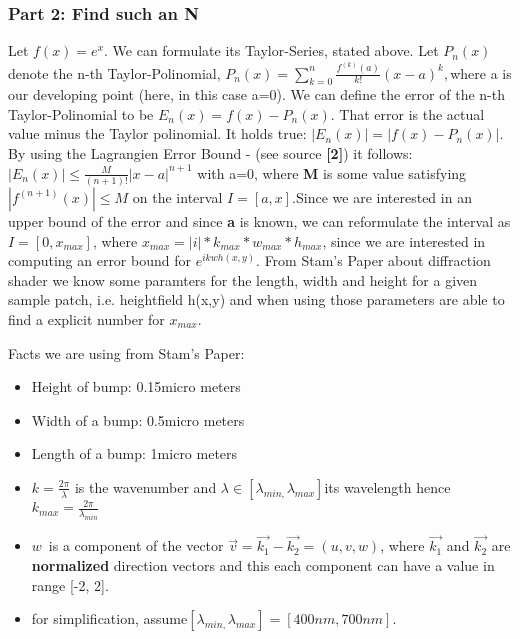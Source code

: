 \subsubsection{Part 2: Find such an N}

Let $f(x)=e^{x}$. We can formulate its Taylor-Series, stated above.
Let $P_{n}(x)$denote the n-th Taylor-Polinomial, $P_{n}(x)=\sum_{k=0}^{n}\frac{f^{(k)}(a)}{k!}(x-a)^{k},$where
a is our developing point (here, in this case a=0). We can define
the error of the n-th Taylor-Polinomial to be $E_{n}(x)=f(x)-P_{n}(x)$.
That error is the actual value minus the Taylor polinomial. It holds
true: $|E_{n}(x)|=|f(x)-P_{n}(x)|$. By using the Lagrangien Error
Bound - (see source \textbf{{[}2{]}}) it follows: $|E_{n}(x)|\leq\frac{M}{(n+1)!}|x-a|^{n+1}$
with a=0, where \textbf{M }is some value satisfying $|f^{(n+1)}(x)|\leq M$
on the interval $I=[a,x]$.Since we are interested in an upper bound
of the error and since \textbf{a} is known, we can reformulate the
interval as $I=[0,x_{max}]$, where $x_{max}=|i|*k_{max}*w_{max}*h_{max}$,
since we are interested in computing an error bound for $e^{ikwh(x,y)}$.
From Stam's Paper about diffraction shader we know some paramters
for the length, width and height for a given sample patch, i.e. heightfield
h(x,y) and when using those parameters are able to find a explicit
number for $x_{max}$.

Facts we are using from Stam's Paper:

\begin{itemize}
\item Height of bump: 0.15micro meters
\item Width of a bump: 0.5micro meters
\item Length of a bump: 1micro meters
\item $k=\frac{2\pi}{\lambda}$ is the wavenumber and $\lambda\in[\lambda_{min,}\lambda_{max}]$its
wavelength hence $k_{max}=\frac{2\pi}{\lambda_{min}}$ 
\item $w$~is a component of the vector $\vec{v}=\vec{k_{1}}-\vec{k_{2}}=(u,v,w)$,
where $\vec{k_{1}}$ and $\vec{k_{2}}$ are \textbf{normalized} direction
vectors and this each component can have a value in range {[}-2, 2{]}.
\item for simplification, assume$[\lambda_{min,}\lambda_{max}]=[400nm,700nm].$
\end{itemize}

